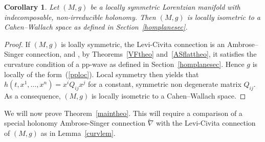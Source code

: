 \documentclass[11pt,a4paper]{amsart}
\newcommand{\tnab}{\widetilde{\nabla}}
\newcommand{\+}{\oplus}
\newcommand{\1}{\mathbf{1}}
\newcommand{\<}{\langle}
\renewcommand{\>}{\rangle}
\theoremstyle{definition}
\theoremstyle{plain}
\newtheorem{corollary}[definition]{Corollary}
\numberwithin{equation}{section}
\begin{document}
\begin{corollary}
Let $(M,g)$ be a locally symmetric Lorentzian manifold with indecomposable, non-irreducible holonomy. Then $(M,g)$ is locally isometric to a Cahen--Wallach space as defined in Section~\ref{homplanesec}.
\end{corollary}
\begin{proof} If $(M,g)$ is loally symmetric, the Levi-Civita connection is an Ambrose--Singer connection, and , by
Theorems~\ref{VFtheo} and~\ref{ASflattheo}, it satisfies the curvature condition of a pp-wave as defined in Section~\ref{homplanesec}. Hence $g$ is locally of the form~(\ref{pploc}).  Local symmetry  then yields that
$h(t,x^1,\ldots, x^n)= x^i Q_{ij} x^j$ for a constant, symmetric non degenerate matrix $Q_{ij}$. As a consequence, $(M,g)$ is locally isometric to a Cahen--Wallach space.
\end{proof}

We will now  prove Theorem~\ref{maintheo}. 
This will require a comparison of  a special holonomy  Ambrose-Singer connection $\tnab$ with the Levi-Civita connection of $(M,g)$ as in Lemma~\ref{curvlem}. 
\end{document}
